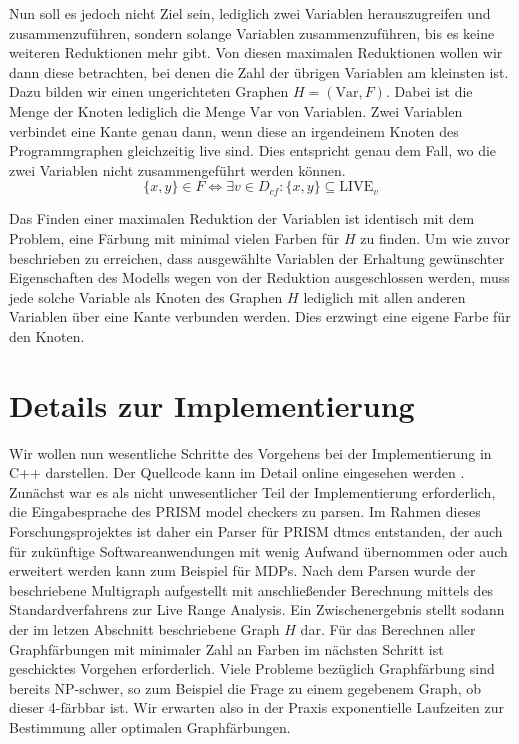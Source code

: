 \documentclass[a4paper]{article}
\theoremstyle{nonumberplain}
\begin{document}
Nun soll es jedoch nicht Ziel sein, lediglich zwei Variablen herauszugreifen und zusammenzuführen, sondern solange Variablen zusammenzuführen, bis es keine weiteren Reduktionen mehr gibt.
Von diesen maximalen Reduktionen wollen wir dann diese betrachten, bei denen die Zahl der übrigen Variablen am kleinsten ist.
Dazu bilden wir einen ungerichteten Graphen $H=(\mathrm{Var}, F)$. Dabei ist die Menge der Knoten lediglich die Menge $\mathrm{Var}$ von Variablen.
Zwei Variablen verbindet eine Kante genau dann, wenn diese an irgendeinem Knoten des Programmgraphen gleichzeitig live sind. Dies entspricht genau dem Fall, wo die zwei Variablen nicht zusammengeführt werden können.
\[
\{x,y\} \in F \Leftrightarrow \exists v \in D_{cf} : \{x, y\} \subseteq \textrm{LIVE}_v 
\]

Das Finden einer maximalen Reduktion der Variablen ist identisch mit dem Problem, eine Färbung mit minimal vielen Farben für $H$ zu finden.
Um wie zuvor beschrieben zu erreichen, dass ausgewählte Variablen der Erhaltung gewünschter Eigenschaften des Modells wegen von der Reduktion ausgeschlossen werden, muss jede solche Variable als Knoten des Graphen $H$ lediglich mit allen anderen Variablen über eine Kante verbunden werden. Dies erzwingt eine eigene Farbe für den Knoten.

\section{Details zur Implementierung}

Wir wollen nun wesentliche Schritte des Vorgehens bei der Implementierung in C++ darstellen.
Der Quellcode kann im Detail online eingesehen werden \cite{PSR}.
Zunächst war es als nicht unwesentlicher Teil der Implementierung erforderlich, die Eingabesprache des PRISM model checkers zu parsen.
Im Rahmen dieses Forschungsprojektes ist daher ein Parser für PRISM dtmcs entstanden, der auch für zukünftige Softwareanwendungen mit wenig Aufwand übernommen oder auch erweitert werden kann zum Beispiel für MDPs.
Nach dem Parsen wurde der beschriebene Multigraph aufgestellt mit anschließender Berechnung mittels des Standardverfahrens zur Live Range Analysis. Ein Zwischenergebnis stellt sodann der im letzen Abschnitt beschriebene Graph $H$ dar.
Für das Berechnen aller Graphfärbungen mit minimaler Zahl an Farben im nächsten Schritt ist geschicktes Vorgehen erforderlich.
Viele Probleme bezüglich Graphfärbung sind bereits NP-schwer, so zum Beispiel die Frage zu einem gegebenem Graph, ob dieser 4-färbbar ist.
Wir erwarten also in der Praxis exponentielle Laufzeiten zur Bestimmung aller optimalen Graphfärbungen.
\end{document}

